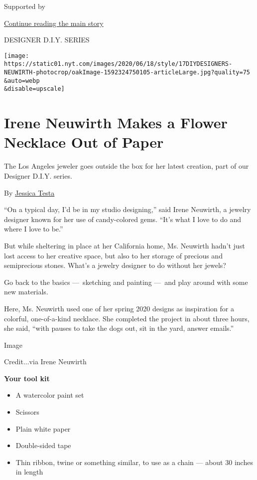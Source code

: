 Supported by

\protect\hyperlink{after-sponsor}{Continue reading the main story}

DESIGNER D.I.Y. SERIES

\texttt{[image: https://static01.nyt.com/images/2020/06/18/style/17DIYDESIGNERS-NEUWIRTH-photocrop/oakImage-1592324750105-articleLarge.jpg?quality=75\\\&auto=webp\\\&disable=upscale]}

\hypertarget{irene-neuwirth-makes-a-flower-necklace-out-of-paper}{%
\section{Irene Neuwirth Makes a Flower Necklace Out of
Paper}\label{irene-neuwirth-makes-a-flower-necklace-out-of-paper}}

The Los Angeles jeweler goes outside the box for her latest creation,
part of our Designer D.I.Y. series.

By \href{https://www.nytimes.com/by/jessica-testa}{Jessica Testa}

``On a typical day, I'd be in my studio designing,'' said Irene
Neuwirth, a jewelry designer known for her use of candy-colored gems.
``It's what I love to do and where I love to be.''

But while sheltering in place at her California home, Ms. Neuwirth
hadn't just lost access to her creative space, but also to her storage
of precious and semiprecious stones. What's a jewelry designer to do
without her jewels?

Go back to the basics ---~sketching and painting ---~and play around
with some new materials.

Here, Ms. Neuwirth used one of her spring 2020 designs as inspiration
for a colorful, one-of-a-kind necklace. She completed the project in
about three hours, she said, ``with pauses to take the dogs out, sit in
the yard, answer emails.''

Image

Credit...via Irene Neuwirth

\textbf{Your tool kit}

\begin{itemize}
\item
  A watercolor paint set
\item
  Scissors
\item
  Plain white paper
\item
  Double-sided tape
\item
  Thin ribbon, twine or something similar, to use as a chain --- about
  30 inches in length
\end{itemize}

